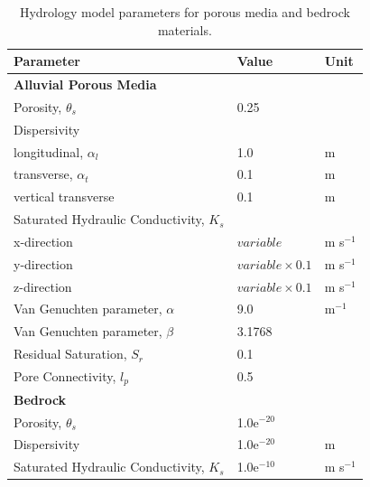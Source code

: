 \documentclass[letterpaper, 11pt]{article}
\begin{document}
\begin{table}[h]
    \centering
    \begin{tabular}{l l l}
    \hline
    \textbf{Parameter} & \textbf{Value} & \textbf{Unit} \\
    \hline
    \textbf{Alluvial Porous Media} & & \\
    \hspace{6pt} Porosity, $\theta_s$ & 0.25 & \\
    \hspace{6pt} Dispersivity & & \\
    \hspace{12pt} longitudinal, $\alpha_l$ & 1.0 & m\\
    \hspace{12pt} transverse, $\alpha_t$ & 0.1 & m\\
    \hspace{12pt} vertical transverse & 0.1 & m\\
    \hspace{6pt} Saturated Hydraulic Conductivity, $K_s$ & & \\
    \hspace{12pt} x-direction  & $variable$ & m s$^{-1}$\\
    \hspace{12pt} y-direction & $variable \times 0.1$ & m s$^{-1}$\\
    \hspace{12pt} z-direction & $variable \times 0.1$ & m s$^{-1}$\\
    \hspace{6pt} Van Genuchten parameter, $\alpha$ & 9.0 & m$^{-1}$\\
    \hspace{6pt} Van Genuchten parameter, $\beta$ & 3.1768 & \\
    \hspace{6pt} Residual Saturation, $S_r$ & 0.1 & \\
    \hspace{6pt} Pore Connectivity, $l_p$ & 0.5 & \\
    \textbf{Bedrock} & & \\
    \hspace{6pt} Porosity, $\theta_s$ & 1.0e$^{-20}$ & \\
    \hspace{6pt} Dispersivity & 1.0e$^{-20}$ & m \\
    \hspace{6pt} Saturated Hydraulic Conductivity, $K_s$ & 1.0e$^{-10}$ & m s$^{-1}$\\
\end{tabular}
    \caption{Hydrology model parameters for porous media and bedrock materials.}
    \label{table:hydrologyparams}
\end{table}
\end{document}
